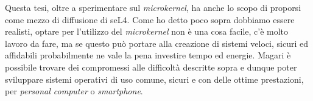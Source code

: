 Questa tesi, oltre a sperimentare sul \textit{microkernel}, ha anche lo scopo di proporsi come mezzo di diffusione di seL4. Come ho detto poco sopra dobbiamo essere realisti, optare per l'utilizzo del \textit{microkernel} non è una cosa facile, c'è molto lavoro da fare, ma se questo può portare alla creazione di sistemi veloci, sicuri ed affidabili probabilmente ne vale la pena investire tempo ed energie. Magari è possibile trovare dei compromessi alle difficoltà descritte sopra e dunque poter sviluppare sistemi operativi di uso comune, sicuri e con delle ottime prestazioni, per \textit{personal computer} o \textit{smartphone}.
